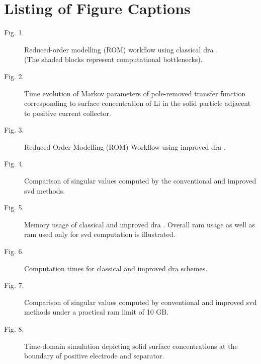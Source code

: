 \section*{Listing of Figure Captions}

\begin{description}
	\item[Fig. 1.]   Reduced-order modelling (ROM) workflow using classical \gls{dra} .\\ (The shaded blocks represent computational bottlenecks).\\
	\item[Fig. 2.]   Time evolution of Markov parameters of pole-removed transfer function corresponding to surface concentration of Li in the solid particle adjacent to positive current collector.\\
	\item[Fig. 3.]   Reduced Order Modelling (ROM) Workflow using improved \gls{dra} .\\
	\item[Fig. 4.]   Comparison of singular values computed by the conventional and improved \gls{svd} methods.\\
	\item[Fig. 5.]	 Memory usage of classical and improved \gls{dra} . Overall \gls{ram} usage as well as \gls{ram} used only for \gls{svd} computation is illustrated.\\
	\item[Fig. 6.] 	 Computation times for classical and improved \gls{dra} schemes.\\
	\item[Fig. 7.]	 Comparison of singular values computed by conventional and improved \gls{svd} methods under a practical \gls{ram} limit of 10 GB.\\
	\item[Fig. 8.]	 Time-domain simulation depicting solid surface concentrations at the boundary of positive electrode and separator.\\
\end{description}




